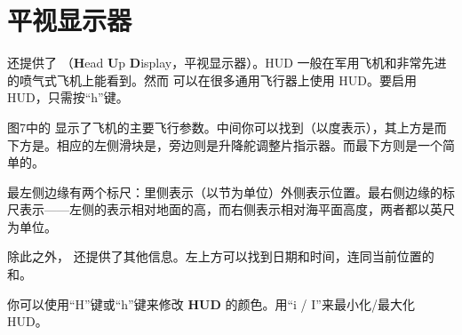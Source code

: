 \ifchinese
\section{平视显示器}
\fi

{}

\ifchinese
\FlightGear{} 还提供了 （\textbf{H}ead \textbf{U}p
\textbf{D}isplay，平视显示器）。HUD 一般在军用飞机和非常先进的喷气式飞机上能看到。然而 \FlightGear{} 可以在很多通用飞行器上使用 HUD。要启用 HUD，只需按“h”键。

图7中的  显示了飞机的主要飞行参数。中间你可以找到（以度表示），其上方是而下方是。相应的左侧滑块是，旁边则是升降舵调整片指示器。而最下方则是一个简单的。

最左侧边缘有两个标尺：里侧表示（以节为单位）外侧表示位置。最右侧边缘的标尺表示——左侧的表示相对地面的高，而右侧表示相对海平面高度，两者都以英尺为单位。

除此之外， 还提供了其他信息。左上方可以找到日期和时间，连同当前位置的和。

你可以使用“H”键或“h”键来修改 \textbf{HUD} 的颜色。用“i / I”来最小化/最大化 HUD。

